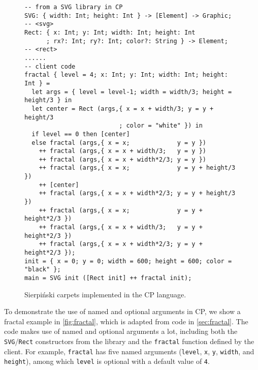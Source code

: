 \begin{figure}[b!]
\begin{lstlisting}[language=CP,xleftmargin=.05\textwidth]
-- from a SVG library in CP
SVG: { width: Int; height: Int } -> [Element] -> Graphic;    -- <svg>
Rect: { x: Int; y: Int; width: Int; height: Int
      ; rx?: Int; ry?: Int; color?: String } -> Element;     -- <rect>
......
-- client code
fractal { level = 4; x: Int; y: Int; width: Int; height: Int } =
  let args = { level = level-1; width = width/3; height = height/3 } in
  let center = Rect (args,{ x = x + width/3; y = y + height/3
                          ; color = "white" }) in
  if level == 0 then [center]
  else fractal (args,{ x = x;             y = y })
    ++ fractal (args,{ x = x + width/3;   y = y })
    ++ fractal (args,{ x = x + width*2/3; y = y })
    ++ fractal (args,{ x = x;             y = y + height/3 })
    ++ [center]
    ++ fractal (args,{ x = x + width*2/3; y = y + height/3 })
    ++ fractal (args,{ x = x;             y = y + height*2/3 })
    ++ fractal (args,{ x = x + width/3;   y = y + height*2/3 })
    ++ fractal (args,{ x = x + width*2/3; y = y + height*2/3 });
init = { x = 0; y = 0; width = 600; height = 600; color = "black" };
main = SVG init ([Rect init] ++ fractal init);
\end{lstlisting}
\caption{Sierpiński carpets implemented in the CP language.} \label{fig:fractal}
\end{figure}

To demonstrate the use of named and optional arguments in CP, we show a fractal
example in \autoref{fig:fractal}, which is adapted from code in
\autoref{sec:fractal}. The code makes use of named and optional arguments a lot,
including both the \lstinline{SVG}/\lstinline{Rect} constructors from the
library and the \lstinline{fractal} function defined by the client. For example,
\lstinline{fractal} has five named arguments (\lstinline{level}, \lstinline{x},
\lstinline{y}, \lstinline{width}, and \lstinline{height}), among which
\lstinline{level} is optional with a default value of \lstinline{4}.

